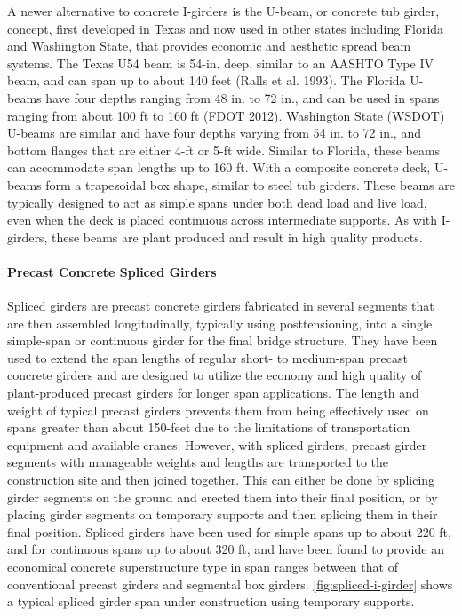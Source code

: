 A newer alternative to concrete I-girders is the U-beam, or concrete tub girder, concept, first developed in Texas
and now used in other states including Florida and Washington State, that provides economic and aesthetic spread
beam systems. The Texas U54 beam is 54-in. deep, similar to an AASHTO Type IV beam, and can span up to about
140 feet (Ralls et al. 1993). The Florida U-beams have four depths ranging from 48 in. to 72 in., and can be used in
spans ranging from about 100 ft to 160 ft (FDOT 2012). Washington State (WSDOT) U-beams are similar and have
four depths varying from 54 in. to 72 in., and bottom flanges that are either 4-ft or 5-ft wide. Similar to Florida, these beams can accommodate span lengths up to 160 ft. With a composite concrete deck, U- beams form a trapezoidal
box shape, similar to steel tub girders. These beams are typically designed to act as simple spans under both dead
load and live load, even when the deck is placed continuous across intermediate supports. As with I-girders, these
beams are plant produced and result in high quality products.

\paragraph{Precast Concrete Spliced Girders}
Spliced girders are precast concrete girders fabricated in several segments that are then assembled
longitudinally, typically using posttensioning, into a single simple-span or continuous girder for the final bridge
structure. They have been used to extend the span lengths of regular short- to medium-span precast concrete girders
and are designed to utilize the economy and high quality of plant-produced precast girders for longer span
applications. The length and weight of typical precast girders prevents them from being effectively used on spans
greater than about 150-feet due to the limitations of transportation equipment and available cranes. However, with
spliced girders, precast girder segments with manageable weights and lengths are transported to the construction site
and then joined together. This can either be done by splicing girder segments on the ground and erected them into
their final position, or by placing girder segments on temporary supports and then splicing them in their final
position. Spliced girders have been used for simple spans up to about 220 ft, and for continuous spans up to about
320 ft, and have been found to provide an economical concrete superstructure type in span ranges between that of
conventional precast girders and segmental box girders. \cref{fig:spliced-i-girder} shows a typical spliced girder span under
construction using temporary supports.

